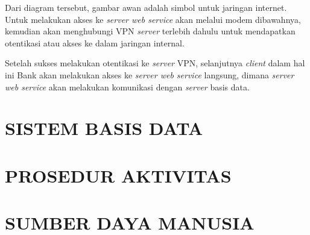 \documentclass[pdftex,12pt, oneside]{article}
\begin{document}
Dari diagram tersebut, gambar awan adalah simbol untuk jaringan internet. Untuk melakukan akses ke \textit{server web service} akan melalui modem dibawahnya, kemudian akan menghubungi VPN \textit{server} terlebih dahulu untuk mendapatkan otentikasi atau akses ke dalam jaringan internal.

Setelah sukses melakukan otentikasi ke \textit{server} VPN, selanjutnya \textit{client} dalam hal ini Bank akan melakukan akses ke \textit{server web service} langsung, dimana \textit{server web service} akan melakukan komunikasi dengan \textit{server} basis data.

\section{SISTEM BASIS DATA}



\section{PROSEDUR AKTIVITAS}


\section{SUMBER DAYA MANUSIA}
\end{document}
